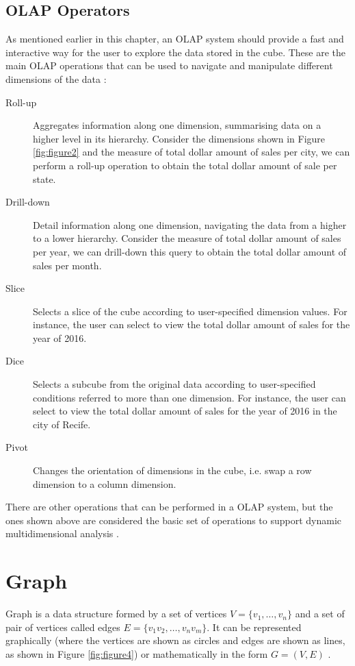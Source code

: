 \subsection{OLAP Operators}
As mentioned earlier in this chapter, an OLAP system should provide a fast and interactive way for the user to explore the data stored in the cube. These are the main OLAP operations that can be used to navigate and manipulate different dimensions of the data \cite{Vassiliadis1998}:

\begin{description}
\item[Roll-up] Aggregates information along one dimension, summarising data on a higher level in its hierarchy. Consider the dimensions shown in Figure \ref{fig:figure2} and the measure of total dollar amount of sales per city, we can perform a roll-up operation to obtain the total dollar amount of sale per state.
\item[Drill-down] Detail information along one dimension, navigating the data from a higher to a lower hierarchy. Consider the measure of total dollar amount of sales per year, we can drill-down this query to obtain the total dollar amount of sales per month.
\item[Slice] Selects a slice of the cube according to user-specified dimension values. For instance, the user can select to view the total dollar amount of sales for the year of 2016.
\item[Dice] Selects a subcube from the original data according to user-specified conditions referred to more than one dimension. For instance, the user can select to view the total dollar amount of sales for the year of 2016 in the city of Recife.
\item[Pivot] Changes the orientation of dimensions in the cube, i.e. swap a row dimension to a column dimension.
\end{description}

There are other operations that can be performed in a OLAP system, but the ones shown above are considered the basic set of operations to support dynamic multidimensional analysis \cite{Inmon2005}.

\section{Graph}
Graph is a data structure formed by a set of vertices $V = \{v_1, \dots, v_n\}$  and a set of pair of vertices called edges $E = \{v_1v_2, \dots, v_nv_m\}$. It can be represented graphically (where the vertices are shown as circles and edges are shown as lines, as shown in Figure \ref{fig:figure4}) or mathematically in the form $G = (V, E)$ \cite{Tobergte2013}.

